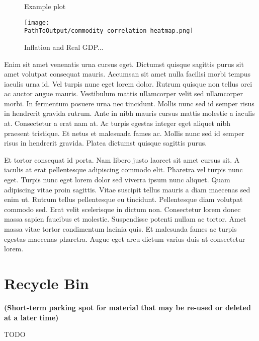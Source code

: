 \documentclass[12pt]{article}
\begin{document}
\begin{figure}
\centering
\caption{Example plot}
  \centering
  \texttt{[image: \\PathToOutput/commodity\_correlation\_heatmap.png]}
\caption*{
  Inflation and Real GDP...
  }
\label{fig:commodity_correlation_heatmap}
\end{figure}

Enim sit amet venenatis urna cursus eget. Dictumst quisque sagittis purus sit
amet volutpat consequat mauris. Accumsan sit amet nulla facilisi morbi tempus
iaculis urna id. Vel turpis nunc eget lorem dolor. Rutrum quisque non tellus
orci ac auctor augue mauris. Vestibulum mattis ullamcorper velit sed
ullamcorper morbi. In fermentum posuere urna nec tincidunt. Mollis nunc sed
id semper risus in hendrerit gravida rutrum. Ante in nibh mauris cursus
mattis molestie a iaculis at. Consectetur a erat nam at. Ac turpis egestas
integer eget aliquet nibh praesent tristique. Et netus et malesuada fames ac.
Mollis nunc sed id semper risus in hendrerit gravida. Platea dictumst quisque
sagittis purus.


Et tortor consequat id porta. Nam libero justo laoreet sit amet cursus sit. A
iaculis at erat pellentesque adipiscing commodo elit. Pharetra vel turpis
nunc eget. Turpis nunc eget lorem dolor sed viverra ipsum nunc aliquet. Quam
adipiscing vitae proin sagittis. Vitae suscipit tellus mauris a diam maecenas
sed enim ut. Rutrum tellus pellentesque eu tincidunt. Pellentesque diam
volutpat commodo sed. Erat velit scelerisque in dictum non. Consectetur lorem
donec massa sapien faucibus et molestie. Suspendisse potenti nullam ac
tortor. Amet massa vitae tortor condimentum lacinia quis. Et malesuada fames
ac turpis egestas maecenas pharetra. Augue eget arcu dictum varius duis at
consectetur lorem.



\section{Recycle Bin}
{\textbf{(Short-term parking spot for material that may be re-used or deleted at a later time)}}

TODO
\end{document}
